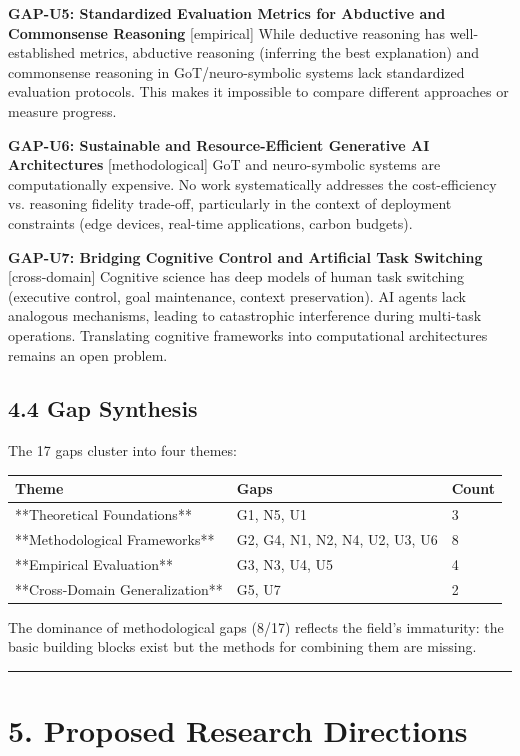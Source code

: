 \documentclass[11pt,a4paper]{article}
\begin{document}
\textbf{GAP-U5: Standardized Evaluation Metrics for Abductive and Commonsense Reasoning} [empirical]
While deductive reasoning has well-established metrics, abductive reasoning (inferring the best explanation) and commonsense reasoning in GoT/neuro-symbolic systems lack standardized evaluation protocols. This makes it impossible to compare different approaches or measure progress.

\textbf{GAP-U6: Sustainable and Resource-Efficient Generative AI Architectures} [methodological]
GoT and neuro-symbolic systems are computationally expensive. No work systematically addresses the cost-efficiency vs. reasoning fidelity trade-off, particularly in the context of deployment constraints (edge devices, real-time applications, carbon budgets).

\textbf{GAP-U7: Bridging Cognitive Control and Artificial Task Switching} [cross-domain]
Cognitive science has deep models of human task switching (executive control, goal maintenance, context preservation). AI agents lack analogous mechanisms, leading to catastrophic interference during multi-task operations. Translating cognitive frameworks into computational architectures remains an open problem.

\subsection{4.4 Gap Synthesis}

The 17 gaps cluster into four themes:

\begin{tabular}{|l|l|}
\hline
Theme & Gaps & Count \\
\hline
**Theoretical Foundations** & G1, N5, U1 & 3 \\
\hline
**Methodological Frameworks** & G2, G4, N1, N2, N4, U2, U3, U6 & 8 \\
\hline
**Empirical Evaluation** & G3, N3, U4, U5 & 4 \\
\hline
**Cross-Domain Generalization** & G5, U7 & 2 \\
\hline
\end{tabular}

The dominance of methodological gaps (8/17) reflects the field's immaturity: the basic building blocks exist but the methods for combining them are missing.

\noindent\rule{\textwidth}{0.4pt}

\section{5. Proposed Research Directions}
\end{document}
